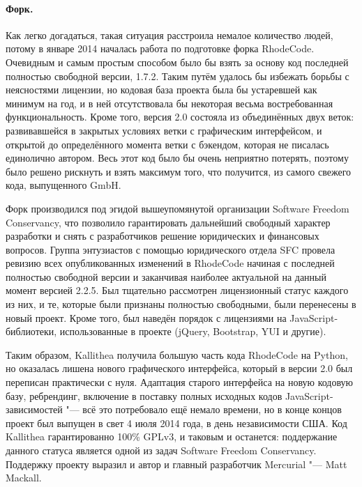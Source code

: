 \documentclass[10pt, a5paper]{article}
\begin{document}
\paragraph{Форк.}

Как легко догадаться, такая ситуация расстроила немалое количество людей, потому в январе 2014 началась работа по подготовке форка RhodeCode. Очевидным и самым простым способом было бы взять за основу код последней полностью свободной версии, 1.7.2. Таким путём удалось бы избежать борьбы с неясностями лицензии, но кодовая база проекта была бы устаревшей как минимум на год, и в ней отсутствовала бы некоторая весьма востребованная функциональность. Кроме того, версия 2.0 состояла из объединённых двух веток: развивавшейся в закрытых условиях ветки с графическим интерфейсом, и открытой до определённого момента ветки с бэкендом, которая не писалась единолично автором. Весь этот код было бы очень неприятно потерять, поэтому было решено рискнуть и взять максимум того, что получится, из самого свежего кода, выпущенного GmbH.

Форк производился под эгидой вышеупомянутой организации Software Freedom Conservancy, что позволило гарантировать дальнейший свободный характер разработки и снять с разработчиков решение юридических и финансовых вопросов. Группа энтузиастов с помощью юридического отдела SFC провела ревизию всех опубликованных изменений в RhodeCode начиная с последней полностью свободной версии и заканчивая наиболее актуальной на данный момент версией 2.2.5. Был тщательно рассмотрен лицензионный статус каждого из них, и те, которые были признаны полностью свободными, были перенесены в новый проект. Кроме того, был наведён порядок с лицензиями на JavaScript-библиотеки, использованные в проекте (jQuery, Bootstrap, YUI и другие).

Таким образом, Kallithea получила большую часть кода \linebreak RhodeCode на Python, но оказалась лишена нового графического интерфейса, который в версии 2.0 был переписан практически с нуля. Адаптация старого интерфейса на новую кодовую базу, ребрендинг, включение в поставку полных исходных кодов JavaScript-зависимостей "--- всё это потребовало ещё немало времени, но в конце концов проект был выпущен в свет 4 июля 2014 года, в день независимости США. Код Kallithea гарантированно 100\% GPLv3, и таковым и останется: поддержание данного статуса является одной из задач Software Freedom Conservancy. Поддержку проекту выразил и автор и главный разработчик Mercurial "--- Matt Mackall.
\end{document}
